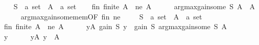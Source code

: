 \begin{isabellebody}
\isamarkupfalse%
\isanewline
\ \ \isamarkupfalse%
\ S\ {\isacharcolon}{\kern0pt}{\isacharcolon}{\kern0pt}\ {\isachardoublequoteopen}{\isacharprime}{\kern0pt}a\ set{\isachardoublequoteclose}\ \ A\ {\isacharcolon}{\kern0pt}{\isacharcolon}{\kern0pt}\ {\isachardoublequoteopen}{\isacharprime}{\kern0pt}a\ set{\isachardoublequoteclose}\isanewline
\ \ \isamarkupfalse%
\ fin{\isacharcolon}{\kern0pt}\ {\isachardoublequoteopen}finite\ A{\isachardoublequoteclose}\ \ ne{\isacharcolon}{\kern0pt}\ {\isachardoublequoteopen}A\ {\isasymnoteq}\ {\isacharbraceleft}{\kern0pt}{\isacharbraceright}{\kern0pt}{\isachardoublequoteclose}\isanewline
\ \ \isamarkupfalse%
\ {\isachardoublequoteopen}argmax{\isacharunderscore}{\kern0pt}gain{\isacharunderscore}{\kern0pt}some\ S\ A\ {\isasymin}\ A{\isachardoublequoteclose}\isanewline
\ \ \ \ \isamarkupfalse%
\ argmax{\isacharunderscore}{\kern0pt}gain{\isacharunderscore}{\kern0pt}some{\isacharunderscore}{\kern0pt}mem{\isacharbrackleft}{\kern0pt}OF\ fin\ ne{\isacharbrackright}{\kern0pt}\ \isakeywordONE{{\isachardot}{\kern0pt}}\isamarkupfalse%
\isanewline
{}\isamarkupfalse%
\isanewline
\ \ \isamarkupfalse%
\ S\ {\isacharcolon}{\kern0pt}{\isacharcolon}{\kern0pt}\ {\isachardoublequoteopen}{\isacharprime}{\kern0pt}a\ set{\isachardoublequoteclose}\ \ A\ {\isacharcolon}{\kern0pt}{\isacharcolon}{\kern0pt}\ {\isachardoublequoteopen}{\isacharprime}{\kern0pt}a\ set{\isachardoublequoteclose}\isanewline
\ \ \isamarkupfalse%
\ fin{\isacharcolon}{\kern0pt}\ {\isachardoublequoteopen}finite\ A{\isachardoublequoteclose}\ \ ne{\isacharcolon}{\kern0pt}\ {\isachardoublequoteopen}A\ {\isasymnoteq}\ {\isacharbraceleft}{\kern0pt}{\isacharbraceright}{\kern0pt}{\isachardoublequoteclose}\isanewline
\ \ \isamarkupfalse%
\ {\isachardoublequoteopen}{\isasymforall}y{\isasymin}A{\isachardot}{\kern0pt}\ gain\ S\ y\ {\isasymle}\ gain\ S\ {\isacharparenleft}{\kern0pt}argmax{\isacharunderscore}{\kern0pt}gain{\isacharunderscore}{\kern0pt}some\ S\ A{\isacharparenright}{\kern0pt}{\isachardoublequoteclose}\isanewline
\ \ \isamarkupfalse%
\isanewline
\ \ \ \ \isamarkupfalse%
\ y\isanewline
\ \ \ \ \isamarkupfalse%
\ yA{\isacharcolon}{\kern0pt}\ {\isachardoublequoteopen}y\ {\isasymin}\ A{\isachardoublequoteclose}\isanewline
\ \ \ \ \isamarkupfalse%

\end{isabellebody}
